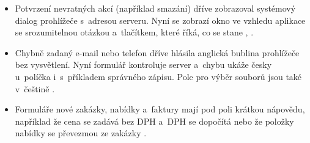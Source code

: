 \begin{itemize}
\item Potvrzení nevratných akcí (například smazání) dříve zobrazoval systémový dialog prohlížeče s~adresou serveru. Nyní se zobrazí okno ve vzhledu aplikace se srozumitelnou otázkou a~tlačítkem, které říká, co se stane \cite{Shneiderman-pravidla}, \cite[s.~2331--2332]{Sajedi2011}.
\item Chybně zadaný e-mail nebo telefon dříve hlásila anglická bublina prohlížeče bez vysvětlení. Nyní formulář kontroluje server a~chybu ukáže česky u~políčka i~s~příkladem správného zápisu. Pole pro výběr souborů jsou také v~češtině \cite{Nielsen-heuristiky}.
\item Formuláře nové zakázky, nabídky a~faktury mají pod poli krátkou nápovědu, například že cena se zadává bez DPH a~DPH se dopočítá nebo že položky nabídky se převezmou ze zakázky \cite[s.~2330]{Sajedi2011}.
\end{itemize}
